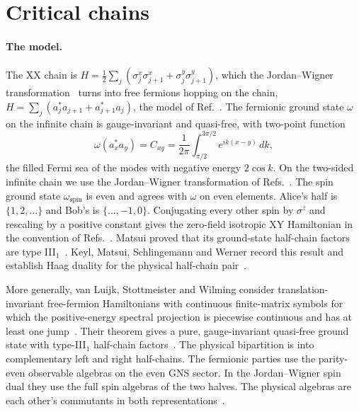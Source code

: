\section{Critical chains}\label{sec:critical}

\paragraph{The model.} The XX chain is $H=\tfrac12\sum_j(\sigma^x_j\sigma^x_{j+1}+\sigma^y_j\sigma^y_{j+1})$,
which the Jordan--Wigner transformation~\cite{LSM61} turns into free fermions hopping on the
chain, $H=\sum_j(a_j^*a_{j+1}+a_{j+1}^*a_j)$, the model of Ref.~\cite[Example~23]{vLSW25}. The
fermionic ground state $\omega$ on the infinite chain is gauge-invariant and quasi-free, with
two-point function
\begin{equation}\label{eq:C}
\omega(a_x^*a_y)=C_{xy}=\frac{1}{2\pi}\int_{\pi/2}^{3\pi/2}e^{ik(x-y)}\,dk ,
\end{equation}
the filled Fermi sea of the modes with negative energy $2\cos k$. On the two-sided infinite chain
we use the Jordan--Wigner transformation of Refs.~\cite{Araki84,ArakiMatsui85}. The spin
ground state $\omega_{\mathrm{spin}}$ is even and agrees with $\omega$ on even elements. Alice's half
is $\{1,2,\ldots\}$ and Bob's is $\{\ldots,-1,0\}$. Conjugating every other spin by $\sigma^z$
and rescaling by a positive constant gives the zero-field isotropic XY Hamiltonian in the
convention of Refs.~\cite{Matsui01,KMSW}. Matsui proved that its ground-state half-chain
factors are type III$_1$~\cite[Theorem~4.3]{Matsui01}. Keyl, Matsui, Schlingemann and Werner
record this result and establish Haag duality for the physical half-chain
pair~\cite[Corollary~6.8 and Proposition~6.9]{KMSW}.

More generally, van Luijk, Stottmeister and Wilming consider translation-invariant
free-fermion Hamiltonians with continuous finite-matrix symbols for which the
positive-energy spectral projection is piecewise continuous and has at least one
jump~\cite[Assumption~20 and Definition~21]{vLSW25}. Their theorem gives a pure,
gauge-invariant quasi-free ground state with type-III$_1$ half-chain
factors~\cite[Theorem~25]{vLSW25}. The physical bipartition is into complementary
left and right half-chains. The fermionic parties use the parity-even observable
algebras on the even GNS sector. In the Jordan--Wigner spin dual they use the full
spin algebras of the two halves. The physical algebras are each other's commutants
in both representations~\cite[Proposition~8 and Remark~10]{vLSW25}.


